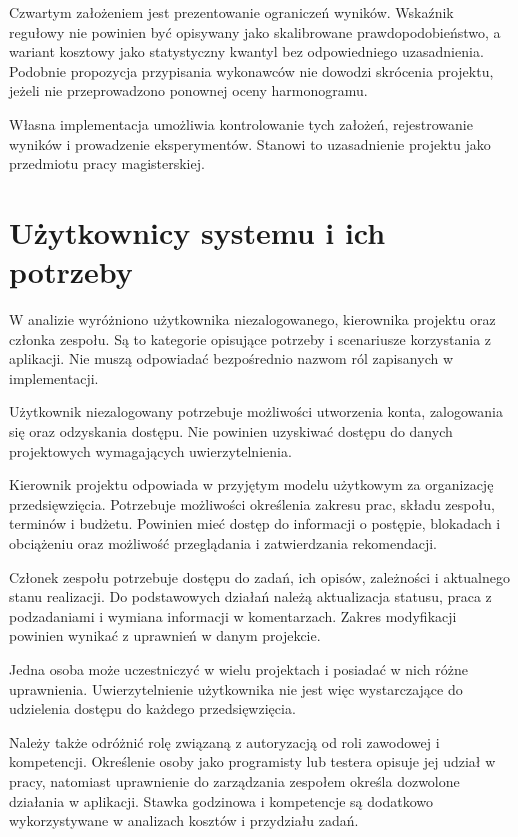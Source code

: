 Czwartym założeniem jest prezentowanie ograniczeń wyników. Wskaźnik regułowy nie powinien być opisywany jako skalibrowane prawdopodobieństwo, a wariant kosztowy jako statystyczny kwantyl bez odpowiedniego uzasadnienia. Podobnie propozycja przypisania wykonawców nie dowodzi skrócenia projektu, jeżeli nie przeprowadzono ponownej oceny harmonogramu.

Własna implementacja umożliwia kontrolowanie tych założeń, rejestrowanie wyników i prowadzenie eksperymentów. Stanowi to uzasadnienie projektu jako przedmiotu pracy magisterskiej.


\section{Użytkownicy systemu i ich potrzeby}
\label{sec:uzytkownicy-i-potrzeby}

W analizie wyróżniono użytkownika niezalogowanego, kierownika projektu oraz członka zespołu. Są to kategorie opisujące potrzeby i scenariusze korzystania z aplikacji. Nie muszą odpowiadać bezpośrednio nazwom ról zapisanych w implementacji.

Użytkownik niezalogowany potrzebuje możliwości utworzenia konta, zalogowania się oraz odzyskania dostępu. Nie powinien uzyskiwać dostępu do danych projektowych wymagających uwierzytelnienia.

Kierownik projektu odpowiada w przyjętym modelu użytkowym za organizację przedsięwzięcia. Potrzebuje możliwości określenia zakresu prac, składu zespołu, terminów i budżetu. Powinien mieć dostęp do informacji o postępie, blokadach i obciążeniu oraz możliwość przeglądania i zatwierdzania rekomendacji.

Członek zespołu potrzebuje dostępu do zadań, ich opisów, zależności i aktualnego stanu realizacji. Do podstawowych działań należą aktualizacja statusu, praca z podzadaniami i wymiana informacji w komentarzach. Zakres modyfikacji powinien wynikać z uprawnień w danym projekcie.

Jedna osoba może uczestniczyć w wielu projektach i posiadać w nich różne uprawnienia. Uwierzytelnienie użytkownika nie jest więc wystarczające do udzielenia dostępu do każdego przedsięwzięcia.

Należy także odróżnić rolę związaną z autoryzacją od roli zawodowej i kompetencji. Określenie osoby jako programisty lub testera opisuje jej udział w pracy, natomiast uprawnienie do zarządzania zespołem określa dozwolone działania w aplikacji. Stawka godzinowa i kompetencje są dodatkowo wykorzystywane w analizach kosztów i przydziału zadań.


